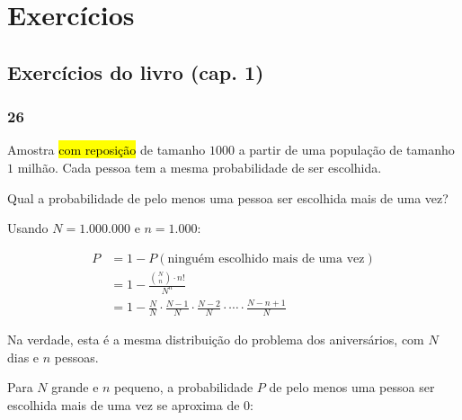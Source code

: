 \documentclass[
  11pt]{report}
\begin{document}
\hypertarget{exercuxedcios-2}{%
\section*{Exercícios}\label{exercuxedcios-2}}

\hypertarget{exercuxedcios-do-livro-cap.-1-2}{%
\subsection*{Exercícios do livro (cap. 1)}\label{exercuxedcios-do-livro-cap.-1-2}}

\hypertarget{section-5}{%
\subsubsection*{26}\label{section-5}}

\begin{rmdbox}
Amostra {\hl{com reposição}} de tamanho $1000$ a partir de uma população de tamanho $1$ milhão. Cada pessoa tem a mesma probabilidade de ser escolhida.

Qual a probabilidade de pelo menos uma pessoa ser escolhida mais de uma vez?

\end{rmdbox}

Usando $N = 1.000.000$ e $n = 1.000$:

\[
\begin{aligned}
P &= 1 - P(\text{ninguém escolhido mais de uma vez}) \\
  &= 1 - \frac{\binom{N}{n} \cdot n!}{N^n} \\
  &= 1 - \frac{N}{N} \cdot \frac{N - 1}{N} \cdot \frac{N - 2}{N} \cdot \cdots \cdot \frac{N - n + 1}{N}
\end{aligned}
\]

Na verdade, esta é a mesma distribuição do problema dos aniversários, com $N$ dias e $n$ pessoas.

Para $N$ grande e $n$ pequeno, a probabilidade $P$ de pelo menos uma pessoa ser escolhida mais de uma vez se aproxima de $0$:
\end{document}
